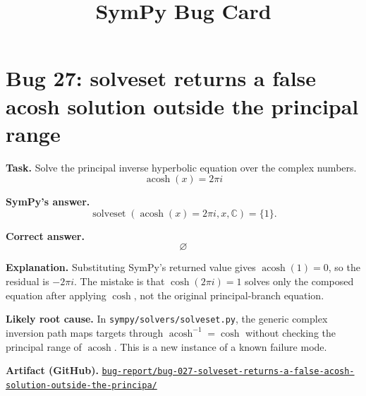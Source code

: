 \documentclass[11pt]{article}
\title{SymPy Bug Card}
\author{}
\date{}
\newcommand{\artifactrepo}{https://github.com/TODO-org/TODO-repo}
\newcommand{\bugbundle}[1]{\href{\artifactrepo/tree/main/bug-report/#1}{\nolinkurl{bug-report/#1/}}}
\begin{document}
\maketitle

\section*{Bug 27: solveset returns a false acosh solution outside the principal range}

\begin{counterexamplebox}
\textbf{Task.} Solve the principal inverse hyperbolic equation over the complex numbers.
\[
  \operatorname{acosh}(x)=2\pi i
\]

\medskip
\textbf{SymPy's answer.}
\[
  \operatorname{solveset}(\operatorname{acosh}(x)=2\pi i, x, \mathbb{C})=\{1\}.
\]

\medskip
\textbf{Correct answer.}
\[
  \varnothing
\]

\medskip
\textbf{Explanation.} Substituting SymPy's returned value gives
\(\operatorname{acosh}(1)=0\), so the residual is \(-2\pi i\).  The mistake is
that \(\cosh(2\pi i)=1\) solves only the composed equation after applying
\(\cosh\), not the original principal-branch equation.

\medskip
\textbf{Likely root cause.} In \nolinkurl{sympy/solvers/solveset.py},
the generic complex inversion path maps targets through
\(\operatorname{acosh}^{-1}=\cosh\) without checking the principal range of
\(\operatorname{acosh}\).  This is a new instance of a known failure mode.

\medskip
\textbf{Artifact (GitHub).} \bugbundle{bug-027-solveset-returns-a-false-acosh-solution-outside-the-principa}
\end{counterexamplebox}
\end{document}

